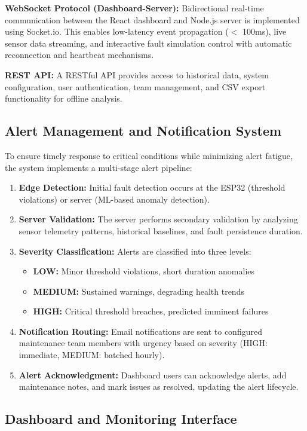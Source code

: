 \documentclass[conference]{IEEEtran}
\begin{document}
\textbf{WebSocket Protocol (Dashboard-Server):} Bidirectional real-time communication between the React dashboard and Node.js server is implemented using Socket.io. This enables low-latency event propagation ($<$ 100ms), live sensor data streaming, and interactive fault simulation control with automatic reconnection and heartbeat mechanisms.

\textbf{REST API:} A RESTful API provides access to historical data, system configuration, user authentication, team management, and CSV export functionality for offline analysis.

\subsection{Alert Management and Notification System}

To ensure timely response to critical conditions while minimizing alert fatigue, the system implements a multi-stage alert pipeline:

\begin{enumerate}
\item \textbf{Edge Detection:} Initial fault detection occurs at the ESP32 (threshold violations) or server (ML-based anomaly detection).
\item \textbf{Server Validation:} The server performs secondary validation by analyzing sensor telemetry patterns, historical baselines, and fault persistence duration.
\item \textbf{Severity Classification:} Alerts are classified into three levels:
\begin{itemize}
\item \textbf{LOW:} Minor threshold violations, short duration anomalies
\item \textbf{MEDIUM:} Sustained warnings, degrading health trends
\item \textbf{HIGH:} Critical threshold breaches, predicted imminent failures
\end{itemize}
\item \textbf{Notification Routing:} Email notifications are sent to configured maintenance team members with urgency based on severity (HIGH: immediate, MEDIUM: batched hourly).
\item \textbf{Alert Acknowledgment:} Dashboard users can acknowledge alerts, add maintenance notes, and mark issues as resolved, updating the alert lifecycle.
\end{enumerate}

\subsection{Dashboard and Monitoring Interface}
\end{document}
